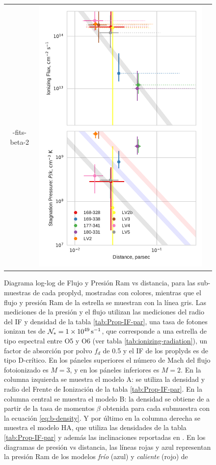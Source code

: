 \begin{figure}
\begin{tabular}{ccc}
-fits-beta-2} & \includegraphics[width=0.3\linewidth]{./Figures/plot-wind-fits-HA98-2}
  \end{tabular}
  \caption{Diagrama log-log de Flujo y Presión Ram vs distancia, para las sub-muestras de cada proplyd, mostradas con colores, mientras que el flujo y presión Ram de la estrella se muestran con la línea gris. Las mediciones de la presión y el flujo utilizan las mediciones del radio del IF y densidad de la tabla \ref{tab:Prop-IF-par}, una tasa de fotones ionizan
    tes de $\mathcal{N}_* = \SI{1e49}{s^{-1}}$, que corresponde a una estrella de tipo espectral entre O5 y O6 (ver tabla \ref{tab:ionizing-radiation}), un factor de absorción por polvo  $f_d$ de 0.5 y el IF de los proplyds es de tipo D-crítico. En los páneles superiores el número de Mach del flujo fotoionizado es $M=3$, y en los páneles inferiores es $M=2$. En la columna izquierda se muestra el modelo A: se utiliza la densidad y radio del Frente de Ionización de la tabla \ref{tab:Prop-IF-par}. En la columna central se muestra el modelo B: la densidad se obtiene de a partir de la tasa de momentos $\beta$ obtenida para cada submuestra con la ecuación \ref{eq:b-density}. Y por último en la columna derecha se muestra el modelo HA, que utiliza las densidades de la tabla \ref{tab:Prop-IF-par} y además las inclinaciones reportadas en \citet{HA:1998}. En los diagramas de presión vs distancia, las líneas rojas y azul representan la presión Ram de los modelos \textit{frío} (azul) y \textit{caliente} (rojo) de \citet{Gagne:2005}}
  \label{fig:wind-fits}
\end{figure}

